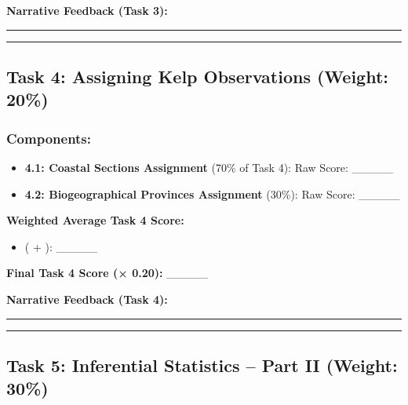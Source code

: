 \documentclass[
  10pt,
]{article}
\providecommand{\tightlist}{%
  \setlength{\itemsep}{0pt}\setlength{\parskip}{0pt}}
\begin{document}
\textbf{Narrative Feedback (Task 3):}

\begin{center}\rule{0.5\linewidth}{0.5pt}\end{center}

\begin{center}\rule{0.5\linewidth}{0.5pt}\end{center}

\subsection{Task 4: Assigning Kelp Observations (Weight:
20\%)}\label{task-4-assigning-kelp-observations-weight-20}

\subsubsection{Components:}\label{components-1}

\begin{itemize}
\tightlist
\item
  \textbf{4.1: Coastal Sections Assignment} (70\% of Task 4): Raw Score:
  \_\_\_\_\_\\
\item
  \textbf{4.2: Biogeographical Provinces Assignment} (30\%): Raw Score:
  \_\_\_\_\_
\end{itemize}

\textbf{Weighted Average Task 4 Score:}

\begin{itemize}
\tightlist
\item
  (   +   ): \_\_\_\_\_
\end{itemize}

\textbf{Final Task 4 Score (× 0.20):} \_\_\_\_\_

\textbf{Narrative Feedback (Task 4):}

\begin{center}\rule{0.5\linewidth}{0.5pt}\end{center}

\begin{center}\rule{0.5\linewidth}{0.5pt}\end{center}

\subsection{Task 5: Inferential Statistics -- Part II (Weight:
30\%)}\label{task-5-inferential-statistics-part-ii-weight-30}
\end{document}
